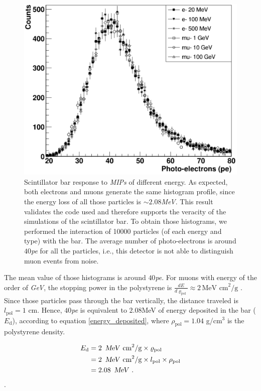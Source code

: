 \documentclass[submitting]{nst}
\begin{document}
\begin{figure}
    \centering
    \includegraphics[scale=0.24]{Figures/MIPS.png}
    \caption{Scintillator bar response to \textsl{MIPs} of different energy. As expected, both electrons and muons generate the same histogram profile, since the energy loss of all those particles is $\sim 2.08$\textsl{MeV}. This result validates the code used and therefore supports the veracity of the simulations of the scintillator bar.
    To obtain those histograms, we performed the interaction of 10000 particles (of each energy and type) with the bar. The average number of photo-electrons is around $40$\textsl{pe} for all the particles, i.e., this detector is not able to distinguish muon events from noise.}
    \label{fig:mips}
\end{figure}

The mean value of those histograms is around $40$\textsl{pe}. For muons with energy of the order of \textsl{GeV}, the stopping power in the polystyrene is $\frac{dE}{d\varrho_\mathrm{pol}}\approx 2 \,\text{MeV cm}^2\text{/g}$ \cite{MichaelEtal2008}. Since those particles pass through the bar vertically, the distance traveled is $l_\mathrm{pol}=1$ cm. Hence, $40$\textsl{pe} is equivalent to $2.08$MeV of energy deposited in the bar ($E_\mathrm{d}$), according to equation \ref{energy_deposited}, where $\rho_\mathrm{pol}=1.04$ g/cm$^3$ is the polystyrene density. 

\begin{equation}
\label{energy_deposited}
\begin{split}
    E_\mathrm{d} &= 2 \,\text{  \textsl{MeV}  cm}^2\text{/g} \times \varrho_\mathrm{pol} \\
    &= 2 \,\text{  \textsl{MeV}  cm}^2\text{/g} \times l_\mathrm{pol} \times \rho_\mathrm{pol}\\
    &= \text{2.08} \, \text{  \textsl{MeV} }.
\end{split}
\end{equation}.
\end{document}
